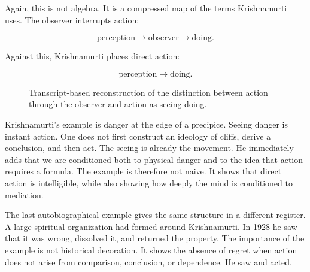 Again, this is not algebra. It is a compressed map of the terms Krishnamurti uses. The observer interrupts action:

\begin{equation}
\text{perception}
\longrightarrow
\text{observer}
\longrightarrow
\text{doing}.
\end{equation}

Against this, Krishnamurti places direct action:

\begin{equation}
\text{perception}
\longrightarrow
\text{doing}.
\end{equation}

\begin{figure}
\centering
{}
\caption{Transcript-based reconstruction of the distinction between action through the observer and action as seeing-doing.}
\end{figure}

Krishnamurti's example is danger at the edge of a precipice. Seeing danger is instant action. One does not first construct an ideology of cliffs, derive a conclusion, and then act. The seeing is already the movement. He immediately adds that we are conditioned both to physical danger and to the idea that action requires a formula. The example is therefore not naive. It shows that direct action is intelligible, while also showing how deeply the mind is conditioned to mediation.

The last autobiographical example gives the same structure in a different register. A large spiritual organization had formed around Krishnamurti. In 1928 he saw that it was wrong, dissolved it, and returned the property. The importance of the example is not historical decoration. It shows the absence of regret when action does not arise from comparison, conclusion, or dependence. He saw and acted.

